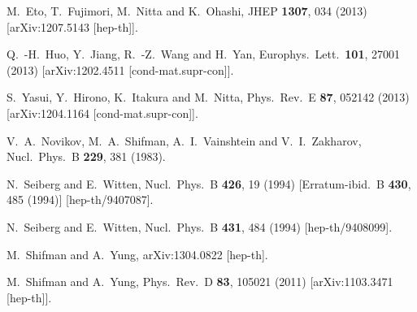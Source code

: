 \documentclass[12pt]{article}
\begin{document}
\begin{thebibliography}{99}
  M.~Eto, T.~Fujimori, M.~Nitta and K.~Ohashi,
  JHEP {\bf 1307}, 034 (2013)
  [arXiv:1207.5143 [hep-th]].

  Q.~-H.~Huo, Y.~Jiang, R.~-Z.~Wang and H.~Yan,
  Europhys.\ Lett.\  {\bf 101}, 27001 (2013)
  [arXiv:1202.4511 [cond-mat.supr-con]].

  S.~Yasui, Y.~Hirono, K.~Itakura and M.~Nitta,
  Phys.\ Rev.\ E {\bf 87}, 052142 (2013)
  [arXiv:1204.1164 [cond-mat.supr-con]].

  V.~A.~Novikov, M.~A.~Shifman, A.~I.~Vainshtein and V.~I.~Zakharov,
  Nucl.\ Phys.\ B {\bf 229}, 381 (1983).

  N.~Seiberg and E.~Witten,
  Nucl.\ Phys.\ B {\bf 426}, 19 (1994)
  [Erratum-ibid.\ B {\bf 430}, 485 (1994)]
  [hep-th/9407087].

  N.~Seiberg and E.~Witten,
  Nucl.\ Phys.\ B {\bf 431}, 484 (1994)
  [hep-th/9408099].

  M.~Shifman and A.~Yung,
  arXiv:1304.0822 [hep-th].

  M.~Shifman and A.~Yung,
  Phys.\ Rev.\ D {\bf 83}, 105021 (2011)
  [arXiv:1103.3471 [hep-th]].


\end{thebibliography}
\end{document}
